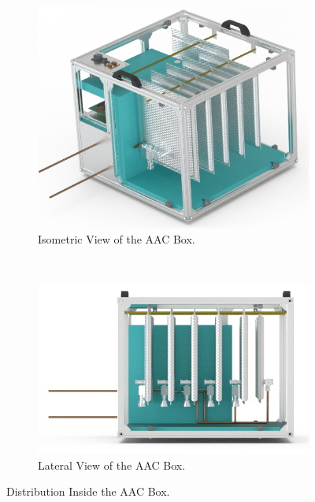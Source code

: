 \begin{figure}[H]
    \centering
    \begin{subfigure}[b]{0.47\textwidth}
        \includegraphics[width=\textwidth]{4-experiment-design/img/Mechanical/Figure_22a.png}
         \caption{Isometric View of the AAC Box.}
    \label{iso_aac}
    \end{subfigure}
    ~
    \begin{subfigure}[b]{0.47\textwidth}
        \centering
         \includegraphics[width=\textwidth]{4-experiment-design/img/Mechanical/Figure_22b.png}
        \caption{Lateral View of the AAC Box.}
        \label{lateral_aac}
        \end{subfigure}
    \caption{Distribution Inside the AAC Box.}
    \label{fig:Distribution-AAC}
\end{figure}

